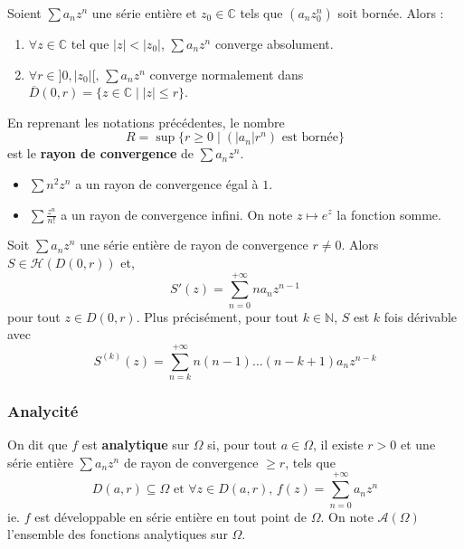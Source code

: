   \begin{lemma}[Abel]
    Soient $\sum a_n z^n$ une série entière et $z_0 \in \mathbb{C}$ tels que $(a_n z_0^n)$ soit bornée. Alors :
    \begin{enumerate}[label=(\roman*)]
      \item $\forall z \in \mathbb{C}$ tel que $|z| < |z_0|$, $\sum a_n z^n$ converge absolument.
      \item $\forall r \in ]0,|z_0|[, \, \sum a_n z^n$ converge normalement dans $\overline{D}(0, r) = \{ z \in \mathbb{C} \mid |z| \leq r \}$.
    \end{enumerate}
  \end{lemma}

  \begin{definition}
    En reprenant les notations précédentes, le nombre
    \[ R = \sup \{ r \geq 0 \mid (|a_n|r^n) \text{ est bornée} \} \]
    est le \textbf{rayon de convergence} de $\sum a_n z^n$.
  \end{definition}


  \begin{example}
    \begin{itemize}
      \item $\sum n^2 z^n$ a un rayon de convergence égal à $1$.
      \item $\sum \frac{z^n}{n!}$ a un rayon de convergence infini. On note $z \mapsto e^z$ la fonction somme.
    \end{itemize}
  \end{example}


  \begin{proposition}
    Soit $\sum a_n z^n$ une série entière de rayon de convergence $r \neq 0$. Alors $S \in \mathcal{H}(D(0, r))$ et,
    \[ S'(z) = \sum_{n=0}^{+\infty} n a_n z^{n-1} \]
    pour tout $z \in D(0, r)$.
    \newpar
    Plus précisément, pour tout $k \in \mathbb{N}$, $S$ est $k$ fois dérivable avec
    \[ S^{(k)}(z) = \sum_{n=k}^{+\infty} n (n-1) \dots (n-k+1) a_n z^{n-k} \]
  \end{proposition}

  \subsubsection{Analycité}


  \begin{definition}
    On dit que $f$ est \textbf{analytique} sur $\Omega$ si, pour tout $a \in \Omega$, il existe $r > 0$ et une série entière $\sum a_n z^n$ de rayon de convergence $\geq r$, tels que
    \[ D(a, r) \subseteq \Omega \text{ et } \forall z \in D(a, r), \, f(z) = \sum_{n=0}^{+\infty} a_n z^n \]
    ie. $f$ est développable en série entière en tout point de $\Omega$. On note $\mathcal{A}(\Omega)$ l'ensemble des fonctions analytiques sur $\Omega$.
  \end{definition}

